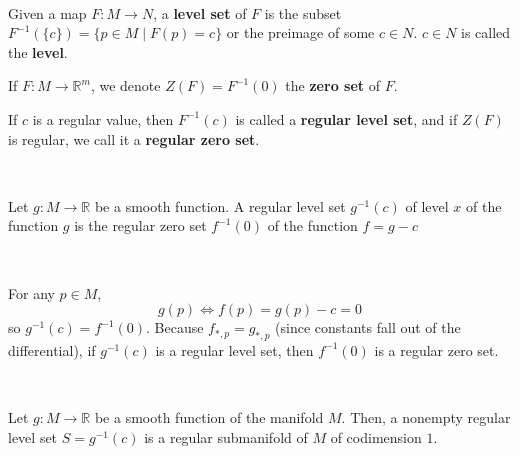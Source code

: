 \documentclass{article}
\begin{document}
\begin{definition}
  \

  Given a map $F: M \to N$, a \textbf{level set} of $F$ is the subset $F ^{-1}(\{c\}) = \{p \in M \mid F(p) = c\}$ or the preimage of some $c\in N$. $c \in N$ is called the \textbf{level}.

  If $F:M \to \mathbb{R}^m$, we denote $Z(F) = F ^{-1}(0)$ the \textbf{zero set} of $F$.

  If $c$ is a regular value, then $F ^{-1}(c)$ is called a \textbf{regular level set}, and if $Z(F)$ is regular, we call it a \textbf{regular zero set}.
\end{definition}

\begin{lemma}
  \

  Let $g: M\to \mathbb{R}$ be a smooth function. A regular level set $g ^{-1}(c)$ of level $x$ of the function $g$ is the regular zero set $f ^{-1}(0)$ of the function $f = g - c$
\end{lemma}

\begin{customproof}
  \

  For any $p \in M$, $$g(p) \iff f(p) = g(p) - c = 0$$so $g ^{-1}(c) = f ^{-1}(0)$. Because $f_{*,p} = g_{*,p}$ (since constants fall out of the differential), if $g ^{-1}(c)$ is a regular level set, then $f ^{-1}(0)$ is a regular zero set.
\end{customproof}

\begin{theorem}
  \

  Let $g: M \to \mathbb{R}$ be a smooth function of the manifold $M$. Then, a nonempty regular level set $S = g ^{-1}(c)$ is a regular submanifold of $M$ of codimension $1$.
\end{theorem}
\end{document}
